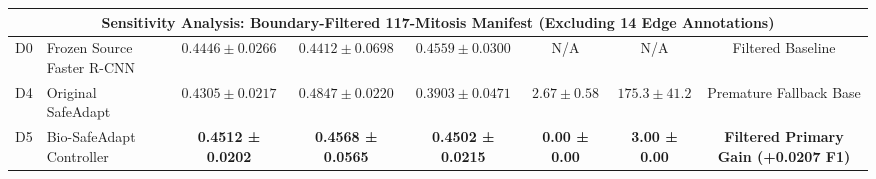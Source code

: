 \documentclass[conference]{IEEEtran}
\begin{document}
\begin{table}[t]
{\begin{tabular}{llcccccc}
\midrule
\multicolumn{8}{c}{\textbf{Sensitivity Analysis: Boundary-Filtered 117-Mitosis Manifest (Excluding 14 Edge Annotations)}} \\
\midrule
D0 & Frozen Source Faster R-CNN & $0.4446 \pm 0.0266$ & $0.4412 \pm 0.0698$ & $0.4559 \pm 0.0300$ & N/A & N/A & Filtered Baseline \\
D4 & Original SafeAdapt & $0.4305 \pm 0.0217$ & $0.4847 \pm 0.0220$ & $0.3903 \pm 0.0471$ & $2.67 \pm 0.58$ & $175.3 \pm 41.2$ & Premature Fallback Base \\
D5 & Bio-SafeAdapt Controller & \textbf{0.4512 ± 0.0202} & \textbf{0.4568 ± 0.0565} & \textbf{0.4502 ± 0.0215} & \textbf{0.00 ± 0.00} & \textbf{3.00 ± 0.00} & \textbf{Filtered Primary Gain (+0.0207 F1)} \\
\bottomrule
\end{tabular}%
}
\end{table}
\end{document}
